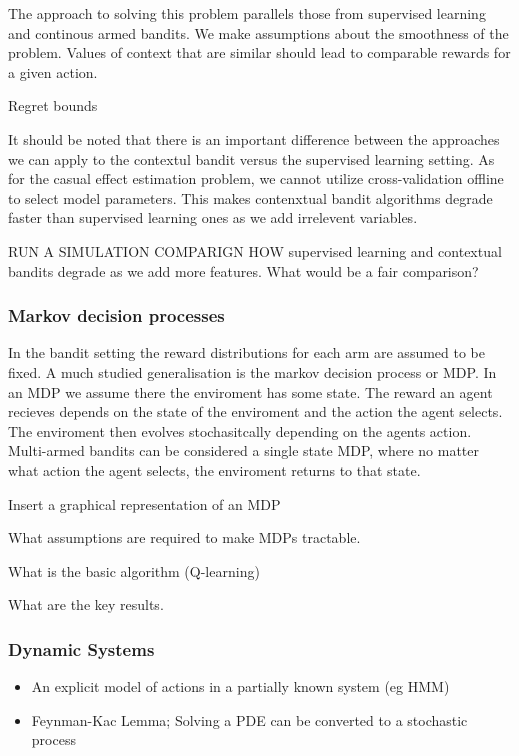 \documentclass[11pt,a4paper,oneside]{book}
\begin{document}
The approach to solving this problem parallels those from supervised learning and continous armed bandits. We make assumptions about the smoothness of the problem. Values of context that are similar should lead to comparable rewards for a given action. 

Regret bounds  

It should be noted that there is an important difference between the approaches we can apply to the contextul bandit versus the supervised learning setting. As for the casual effect estimation problem, we cannot utilize cross-validation offline to select model parameters. This makes contenxtual bandit algorithms degrade faster than supervised learning ones as we add irrelevent variables. 

RUN A SIMULATION COMPARIGN HOW supervised learning and contextual bandits degrade as we add more features. What would be a fair comparison?

\subsubsection*{Markov decision processes}
In the bandit setting the reward distributions for each arm are assumed to be fixed. A much studied generalisation is the markov decision process or MDP. In an MDP we assume there the enviroment has some state. The reward an agent recieves depends on the state of the enviroment and the action the agent selects. The enviroment then evolves stochasitcally depending on the agents action. Multi-armed bandits can be considered a single state MDP, where no matter what action the agent selects, the enviroment returns to that state. 

Insert a graphical representation of an MDP

What assumptions are required to make MDPs tractable. 

What is the basic algorithm (Q-learning)

What are the key results.

\subsubsection*{Dynamic Systems}
\begin{itemize}
\item An explicit model of actions in a partially known system (eg HMM)
\item Feynman-Kac Lemma; Solving a PDE can be converted to a stochastic process
\end{itemize}
\end{document}
